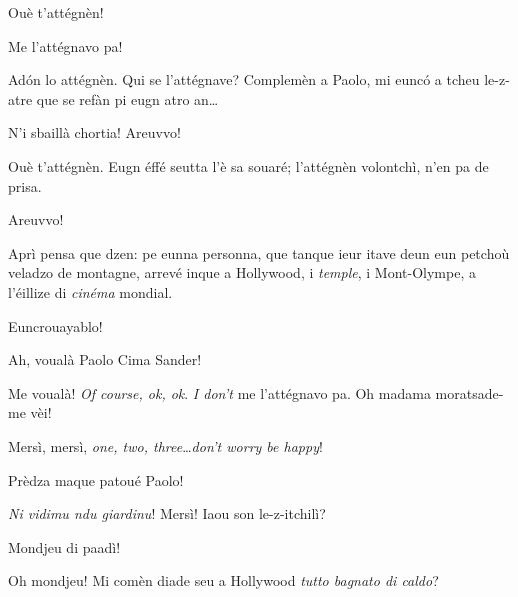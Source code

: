 \begin{drama}
\Conducteurspeaks Ouè t'attégnèn!


\Cimaspeaks Me l'attégnavo pa!


\Conducteurspeaks Ad\'on lo attégnèn. Qui se l'attégnave? Complemèn a Paolo, mi euncó a tcheu le-z-atre que se refàn pi eugn atro an\ldots

\Cimaspeaks{} N'i sbaillà chortia! Areuvvo!

\Conducteurspeaks Ouè t'attégnèn. Eugn éffé seutta l'è sa souaré; l'attégnèn volontchì, n'en pa de prisa.

\Cimaspeaks{} Areuvvo!

\Conducteurspeaks{} Aprì pensa que dzen: pe eunna personna, que tanque ieur itave deun eun petchoù veladzo de montagne, arrevé inque a Hollywood, i \textit{temple}, i Mont-Olympe, a l'éillize di \textit{cinéma} mondial.

\Vallettaspeaks Euncrouayablo!

\Conducteurspeaks Ah, voualà Paolo Cima Sander!


\Cimaspeaks{} Me voualà! \textit{Of course, ok, ok}. \textit{I don't} me l'attégnavo pa.  Oh madama moratsade-me vèi!


\Cimaspeaks Mersì, mersì, \textit{one, two, three}\ldots \textit{don't worry be happy}!

\Conducteurspeaks Prèdza maque patoué Paolo!

\Cimaspeaks{} \textit{Ni vidimu ndu giardinu}! Mersì!  Iaou son le-z-itchilì?


\Cimaspeaks{} Mondjeu di paadì!


\Cimaspeaks Oh mondjeu! Mi comèn diade seu a Hollywood \og \textit{tutto bagnato di caldo}\fg{}?


\end{drama}
